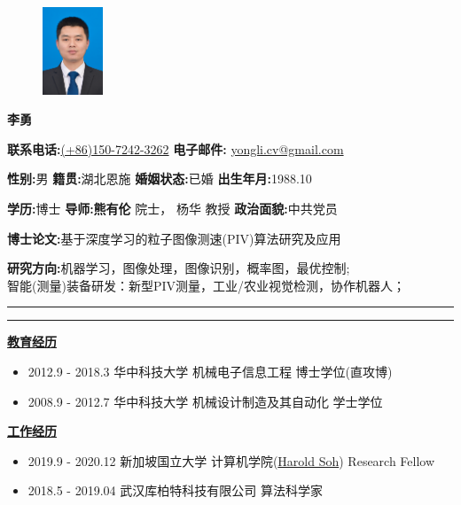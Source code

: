 \documentclass[a4paper,fontsize=11pt]{scrartcl} %
\newcommand{\name}[1]{ %
\noindent\Large\textbf{#1}\normalsize\par}
\newcommand{\bfill}[1]{
	\makebox[#1]{\hfil}}
\newcommand{\stitle}[1]{
	\noindent\underline{\textbf{#1}} \normalsize\par}
\begin{document}
\begin{figure} %
	\vspace*{-0.42cm}
    \hfil\includegraphics[width=0.16\textwidth]{yong.jpg}
\end{figure}

\name{李\quad 勇}
\noindent \textbf{联系电话:}\href{tel:+8615072423262}{(+86)150-7242-3262} \bfill{1.25cm}
\textbf{电子邮件:} \href{mailto:yongli.cv@gmail.com}{yongli.cv@gmail.com}

\noindent \textbf{性别:}男 \bfill{1.2cm}
\textbf{籍贯:}湖北恩施 \bfill{0.75cm}
\textbf{婚姻状态:}已婚 \bfill{0.2cm}
\textbf{出生年月:}1988.10

\noindent \textbf{学历:}博士 \bfill{0.8cm}
\textbf{导师:熊有伦} 院士， 杨华 教授 \bfill{1.48cm}
\textbf{政治面貌:}中共党员 

\noindent \textbf{博士论文:}基于深度学习的粒子图像测速(PIV)算法研究及应用

\noindent \textbf{研究方向:}机器学习，图像处理，图像识别，概率图，最优控制;\\
\bfill{0.66cm}智能(测量)装备研发：新型PIV测量，工业/农业视觉检测，协作机器人； 

\vspace{0.1cm}
\hrule height 0.05cm 
\vspace{0.05cm}
\hrule
\vspace{0.05cm}

\stitle{教育经历}
\begin{itemize}
	\setlength\itemsep{0.0cm}
	\item  2012.9 - 2018.3 \bfill{1cm} 
			华中科技大学 \bfill{1cm}
			机械电子信息工程\bfill{1.4cm}
			博士学位(直攻博)
	\item  2008.9 - 2012.7 \bfill{1cm}
			华中科技大学 \bfill{1cm} 
			机械设计制造及其自动化\bfill{1.7cm}
			学士学位
\end{itemize}

\stitle{工作经历}
\begin{itemize}
	\setlength\itemsep{0.0cm}
	\item 2019.9 - 2020.12 \bfill{0.8cm}
			新加坡国立大学\bfill{0.7cm}
			计算机学院(\href{https://haroldsoh.com/}{Harold Soh})\bfill{0.4cm}
			Research Fellow
 	\item 2018.5 - 2019.04\bfill{0.9cm}
			武汉库柏特科技有限公司\bfill{3.8cm}
			算法科学家
\end{itemize}
\end{document}
